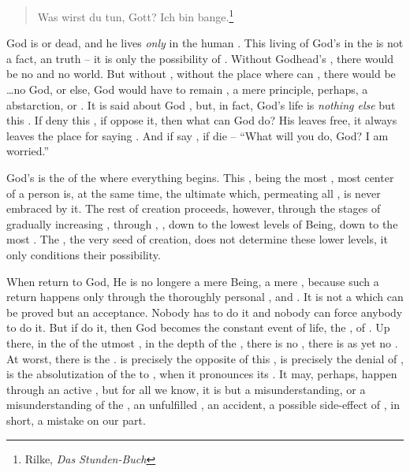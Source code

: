{{\begin{verse}
{{Was wirst du tun, Gott? Ich bin bange.\footnote{Rilke, {\em Das Stunden-Buch}}
}}\end{verse}
%
God is  or dead, and he lives  {\em
only} in the human .   This living  of
God's in the  is not a fact, an  truth -- it is
only the possibility of \yes.  Without Godhead's ,
there would be no  and no world.  But without , without
the place where  can , there would be \ldots no
God, or else, God would have to remain , a mere principle,
perhaps, a  abstarction,  or
.  It is said about God , but, in fact, God's life is {\em
nothing else} but this .  If  deny this , if
 oppose it, then what can God do?  His  leaves
 free, it always leaves the place for saying \No.  And if
 say \No, if  die -- ``What will you do, God?  I am
worried.''

\pa God's  is the  of the
 where everything begins.  This , being the
most , most  center of a person is, at the
same time, the ultimate  which, permeating all
, is never embraced by it.  The rest of creation
proceeds, however, through the stages of gradually increasing
, through , , down to the lowest
levels of Being, down to the most  .  The
, the very seed of creation, does not determine these lower
levels, it only conditions their possibility.

When  return to God, He is no longere a mere Being, a mere 
, because such a return happens only through the thoroughly 
personal ,
 and . It is not a  which can 
be proved but an  acceptance. Nobody has to do it and 
nobody can force anybody to do it. But if  do it, then God 
becomes the constant event of  life, the 
,   of . 
Up
there, in the  of the utmost , in the
depth of the , there is no ,
there is as yet no .  At worst, there is the .
 is precisely the opposite of
this , is precisely the denial of ,
is the absolutization of the  to ,  
when it  pronounces its .  It
may, perhaps, happen through an active \No, but for all we know, it is
but a  misunderstanding, or a misunderstanding of the
, an unfulfilled , an accident, a possible
side-effect of , in short, a mistake on our part.


}}
